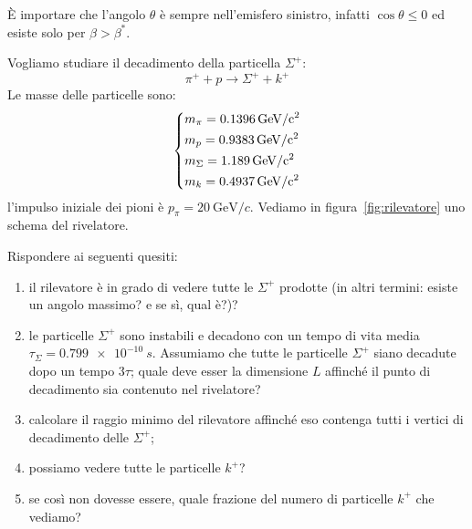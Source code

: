 \begin{note}[]
	È importare che l'angolo $\theta$ è sempre nell'emisfero sinistro, infatti
	$\cos \theta \leq 0$ ed esiste solo per $\beta > \beta ^{\ast}$.
\end{note}

\begin{example}
	Vogliamo studiare il decadimento della particella $\Sigma^+$:
	\begin{equation}
		\pi^+ + p \rightarrow \Sigma^+ + k^+
	\end{equation}
	Le masse delle particelle sono:
	\begin{equation}
		\begin{dcases}
			m _{\pi} = \SI{0.1396}{\GeV \per c^2}
			\\
			m _{p} = \SI{0.9383}{\GeV \per c^2}
			\\
			m _{\Sigma} = \SI{1.189}{\GeV \per c^2}
			\\
			m _{k} = \SI{0.4937}{\GeV \per c^2}
		\end{dcases}
	\end{equation}
	l'impulso iniziale dei pioni è $p _{\pi} = \SI{20}{\GeV \per c}$. Vediamo in
	figura~\ref{fig:rilevatore} uno schema del rivelatore.

	Rispondere ai seguenti quesiti:
	\begin{enumerate}
		\item il rilevatore è in grado di vedere tutte le $\Sigma^+$ prodotte (in
		      altri termini: esiste un angolo massimo? e se sì, qual è?)?
		\item le particelle $\Sigma^+$ sono instabili e decadono con un tempo di
		      vita media $\tau_\Sigma = \SI{0.799e-10}{s}$. Assumiamo che tutte le
		      particelle $\Sigma^+$ siano decadute dopo un tempo $3 \tau$; quale deve
		      esser la dimensione $L$ affinché il punto di decadimento sia contenuto
		      nel rivelatore?
		\item calcolare il raggio minimo del rilevatore affinché eso contenga tutti
		      i vertici di decadimento delle $\Sigma^+$;
		\item possiamo vedere tutte le particelle $k^+$?
		\item se così non dovesse essere, quale frazione del numero di particelle
		      $k^+$ che vediamo?
	\end{enumerate}


\end{example}
